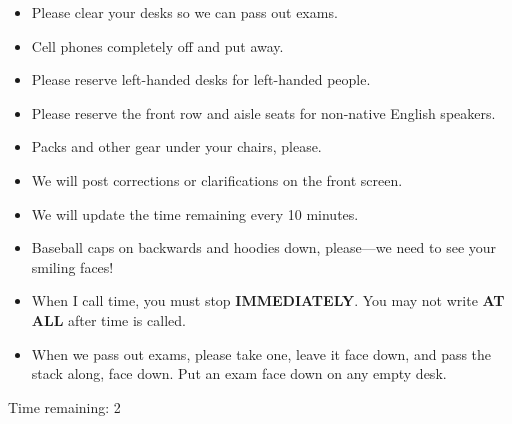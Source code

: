 \begin{frame}
    \begin{itemize}
        \item Please clear your desks so we can pass out exams.
        \item Cell phones completely off and put away.
        \item Please reserve left-handed desks for left-handed people.
        \item Please reserve the front row and aisle seats for
            non-native English speakers.
        \item Packs and other gear under your chairs, please.
        \item We will post corrections or clarifications on the front screen.
        \item We will update the time remaining every 10 minutes.
        \item Baseball caps on backwards and hoodies down, please---we need to
            see your smiling faces!
        \item When I call time, you must stop \textbf{IMMEDIATELY}. You may not
            write \textbf{AT ALL} after time is called.
        \item When we pass out exams, please take one, leave it face down, and
            pass the stack along, face down. Put an exam face down on any empty
            desk.
    \end{itemize}
\end{frame}

\begin{frame}[t]
    \begin{center}
        \vspace{0.5cm}
        {\Huge Time remaining: 2}
    \end{center}

\end{frame}




